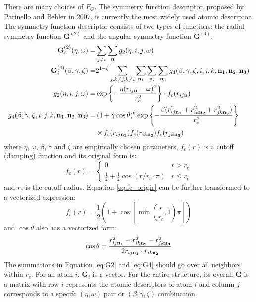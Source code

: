 \documentclass[final,1p,times]{elsarticle}
\begin{document}
There are many choices of $F_G$. The symmetry function descriptor, proposed 
by Parinello and Behler in 2007\cite{Behler}, is currently the most widely used 
atomic descriptor. The symmetry function descriptor consists of two types of 
functions: the radial symmetry function $\mathbf{G}^{(2)}$ and the angular 
symmetry function $\mathbf{G}^{(4)}$:
\begin{align}
\label{eq:G2}
\mathbf{G}^{(2)}_i(\eta, \omega) = & \sum_{j \neq i}{
    \sum_{\mathbf{n}}{g_2 (\eta, i, j, \omega)}
} \\
\label{eq:G4}
\mathbf{G}^{(4)}_i(\beta, \gamma, \zeta) 
= & 2^{1-\zeta}\sum_{j, k\neq j, k\neq i}{
    \sum_{\mathbf{n}_1}{\sum_{\mathbf{n}_2}{\sum_{\mathbf{n}_3}{
        g_4(\beta, \gamma, \zeta, 
          i, j, k, 
          \mathbf{n}_1, \mathbf{n}_2, \mathbf{n}_3)
    }}}
} \\
\label{eq:g2}
g_2(\eta, i, j, \omega) = 
& \exp\left\{-\frac{\eta(r_{ij\mathbf{n}} - \omega)^2}{r_c^2} \right\} \cdot f_c(r_{ij\mathbf{n}}) \\
\label{eq:g4}
g_4(
    \beta, \gamma, \zeta, 
    i, j, k, 
    \mathbf{n}_1, \mathbf{n}_2, \mathbf{n}_3) = & 
\left( 1 + \gamma\cos\theta \right)^\zeta 
    \exp \left\{ -\frac{\beta(r_{ij\mathbf{n_1}}^2 + r_{ik\mathbf{n_2}}^2 + r_{jk\mathbf{n_3}}^2)}{r_c^2} \right\}
\nonumber \\
& \times f_c(r_{ij\mathbf{n_1}})f_c(r_{ik\mathbf{n_2}})f_c(r_{jk\mathbf{n_3}})
\end{align}
where $\eta$, $\omega$, $\beta$, $\gamma$ and $\zeta$ are empirically chosen 
parameters, $f_c(r)$ is a cutoff (damping) function and its original form is:
\begin{equation}
\label{eq:fc_origin}
f_c(r) =
    \begin{cases}
    0 & \text{$r > r_c$} \\
    \frac{1}{2} + \frac{1}{2}\cos\left(r / r_c \cdot \pi \right) & 
    \text{$r \leq r_c$}
    \end{cases}
\end{equation}
and $r_c$ is the cutoff radius. Equation \eqref{eq:fc_origin} can be further 
transformed to a vectorized expression:
\begin{equation}
\label{eq:fc}
f_c(r) = \frac{1}{2}\left( 
    1 + \cos\left[ \min(\frac{r}{r_c}, 1) \pi \right] 
\right)
\end{equation} 
and $\cos\theta$ also has a vectorized form:
\begin{equation}
\cos\theta = \frac{r_{ij\mathbf{n_1}}^2 + r_{ik\mathbf{n_2}}^2 - r_{jk\mathbf{n_3}}^2}{2 r_{ij\mathbf{n_1}} \cdot r_{ik\mathbf{n_2}}}
\end{equation}
The summations in Equation \ref{eq:G2} and \ref{eq:G4} should go over all 
neighbors within $r_c$. For an atom $i$, $\mathbf{G}_i$ is a vector. For the 
entire structure, its overall $\mathbf{G}$ is a matrix with row $i$ represents 
the atomic descriptors of atom $i$ and column $j$ corresponds to a specifc 
$(\eta, \omega)$ pair or $(\beta, \gamma, \zeta)$ combination.
\end{document}
